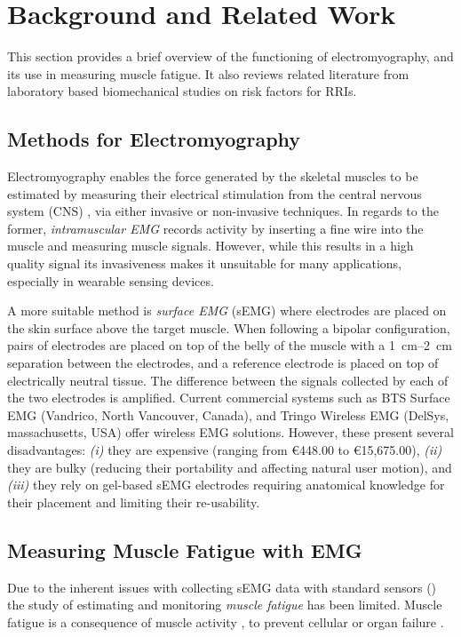 \documentclass[letterpaper, 10 pt, conference]{ieeeconf}
\begin{document}
\section{Background and Related Work}\label{s:related_work}
This section provides a brief overview of the functioning of electromyography,
and its use in measuring muscle fatigue. It also reviews related literature 
from laboratory based biomechanical studies on risk factors for RRIs.

\subsection{Methods for Electromyography}\label{ss:mus_emg}
Electromyography enables the force generated by the skeletal muscles to be
estimated by measuring their electrical stimulation from the central nervous
system (CNS) \cite{gonzalez2010emg}, via either invasive or non-invasive techniques. In regards to the former, \emph{intramuscular EMG} records activity by
inserting a fine wire into the muscle and measuring muscle signals. However,
while this results in a high quality signal its invasiveness makes it
unsuitable for many applications, especially in wearable sensing devices. 

A more suitable method is \emph{surface EMG} (sEMG) where electrodes
are placed on the skin surface above the target muscle. When following a
bipolar configuration, pairs of electrodes are placed on top of the belly of the muscle with a \SIrange{1}{2}{\centi\meter}
separation between the electrodes, and a reference electrode is placed on top of electrically neutral tissue.
The difference between the signals collected by each of the two electrodes
is amplified. 
Current commercial systems such as BTS Surface EMG (Vandrico, North 
Vancouver, Canada), and Tringo Wireless EMG (DelSys, massachusetts, USA) offer wireless EMG solutions. However, these present several disadvantages: 
\emph{(i)} they are expensive (ranging from \euro{448.00} to \euro{15,675.00}), \emph{(ii)} they are bulky (reducing their portability and affecting natural user motion), and \emph{(iii)} they rely on gel-based sEMG electrodes requiring anatomical knowledge for their placement and limiting their re-usability.







\subsection{Measuring Muscle Fatigue with EMG}\label{ss:mus_fati}
Due to the inherent issues with collecting sEMG data with standard sensors () the study of estimating and monitoring \emph{muscle fatigue} has been limited. Muscle fatigue is a consequence of muscle activity
\cite{gonzalez2012electromyographic}, to prevent cellular or organ failure
\cite{noakes2000physiological}.
\end{document}
